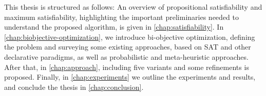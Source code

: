 This thesis is structured as follows:
An overview of propositional satisfiability and maximum satisfiability, highlighting the important preliminaries needed to understand the proposed algorithm, is given in \cref{chap:satisfiability}.
In \cref{chap:biobjective-optimization}, we introduce bi-objective optimization, defining the problem and surveying some existing approaches, based on SAT and other declarative paradigms, as well as probabilistic and meta-heuristic approaches.
After that, in \cref{chap:approach}, \algname{} including five variants and some refinements is proposed.
Finally, in \cref{chap:experiments} we outline the experiments and results, and conclude the thesis in \cref{chap:conclusion}.